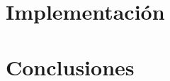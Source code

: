 \documentclass[journal]{IEEEtran}
\begin{document}
    

    \section{Implementación}

    

    

    

    \section{Conclusiones}

    
    
    

    
\end{document}

